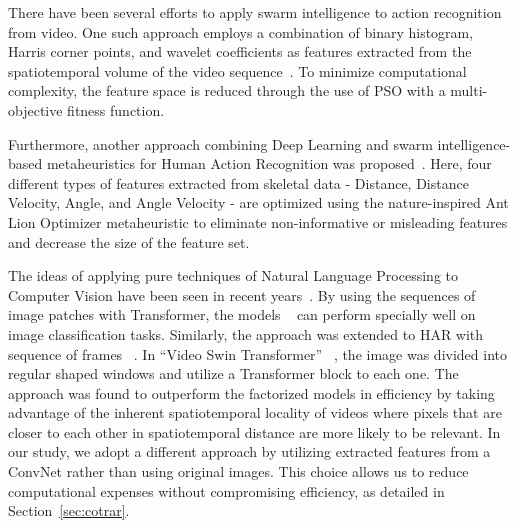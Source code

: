 \documentclass[fleqn,10pt]{wlscirep}
\begin{document}
There have been several efforts to apply swarm intelligence to action recognition from video. One such approach employs a combination of binary histogram, Harris corner points, and wavelet coefficients as features extracted from the spatiotemporal volume of the video sequence~\cite{zhang2022sports}. To minimize computational complexity, the feature space is reduced through the use of PSO with a multi-objective fitness function. 

Furthermore, another approach combining Deep Learning and swarm intelligence-based metaheuristics for Human Action Recognition was proposed~\cite{basak2022union}. Here, four different types of features extracted from skeletal data - Distance, Distance Velocity, Angle, and Angle Velocity - are optimized using the nature-inspired Ant Lion Optimizer metaheuristic to eliminate non-informative or misleading features and decrease the size of the feature set. 

The ideas of applying pure techniques of Natural Language Processing to Computer Vision have been seen in recent years~\cite{arnab2021vivit, dosovitskiy2020image, phong2020rethinking}. By using the sequences of image patches with Transformer, the models ~\cite{dosovitskiy2020image} can perform specially well on image classification tasks. Similarly, the approach was extended to HAR with sequence of frames ~\cite{arnab2021vivit}. In “Video Swin Transformer” ~\cite{liu2022video}, the image was divided into regular shaped windows and utilize a Transformer block to each one. The approach was found to outperform the factorized models in efficiency by taking advantage of the inherent spatiotemporal locality of videos where pixels that are closer to each other in spatiotemporal distance are more likely to be relevant. In our study, we adopt a different approach by utilizing extracted features from a ConvNet rather than using original images. This choice allows us to reduce computational expenses without compromising efficiency, as detailed in Section~\ref{sec:cotrar}.
\end{document}
